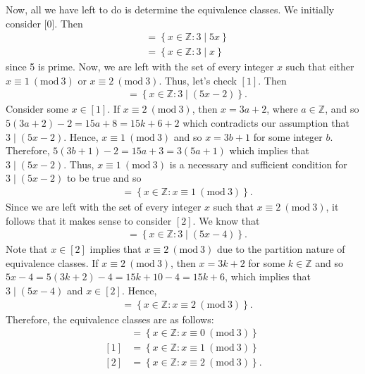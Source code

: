 \documentclass[12pt]{article}
\newcommand{\Z}{\mathbb{Z}}
\newcommand{\Mod}[1]{\ (\mathrm{mod}\ #1)}
\newenvironment{problem}[2][Problem]{\begin{trivlist} \item[\hskip \labelsep {\bfseries #1}\hskip \labelsep {\bfseries #2.}]}{\end{trivlist}}
\newenvironment{solution}[2][Solution]{\begin{trivlist} \item[\hskip \labelsep {\bfseries #1}\hskip \labelsep {\bfseries #2.}]}{\end{trivlist}}
\begin{document}
\begin{problem}{49}
\begin{solution}{49}
    Now, all we have left to do is determine the equivalence classes. We initially consider [0]. Then
    \begin{align*}
      [0] &= \left\{ x\in \Z:3\mid 5x \right\}\\
      &= \left\{ x\in \Z: 3\mid x \right\}
    \end{align*}
    since 5 is prime. Now, we are left with the set of every integer $x$ such that either $x \equiv 1 \Mod 3$ or $x \equiv 2 \Mod 3$. Thus, let's check $[1]$. Then
    \begin{align*}
      [1] &= \left\{x\in \Z:3\mid(5x-2)\right\}.
    \end{align*}
    Consider some $x\in [1]$. If $x \equiv 2\Mod 3$, then $x=3a+2$, where $a\in\Z$, and so $5(3a+2)-2=15a+8=15k+6+2$ which contradicts our assumption that $3\mid(5x-2)$. Hence, $x \equiv 1\Mod 3$ and so $x=3b+1$ for some integer $b$. Therefore, $5(3b+1)-2=15a+3 = 3(5a+1)$ which implies that $3\mid (5x-2)$. Thus, $x\equiv 1\Mod 3$ is a necessary and sufficient condition for $3\mid(5x-2)$ to be true and so
     \begin{align*}
      [1] &= \left\{x\in \Z:x\equiv 1\Mod 3\right\}.
    \end{align*}
    Since we are left with the set of every integer $x$ such that $x\equiv 2\Mod 3$, it follows that it makes sense to consider $[2]$. We know that
    \begin{align*}
      [2] &= \left\{ x\in \Z:3\mid(5x-4) \right\}.
    \end{align*}
    Note that $x\in [2]$ implies that $x\equiv 2\Mod 3$ due to the partition nature of equivalence classes. If $x\equiv 2\Mod 3$, then $x=3k+2$ for some $k\in\Z$ and so $5x-4 = 5(3k+2)-4= 15k+10-4= 15k+6$, which implies that $3\mid (5x-4)$ and $x\in [2]$. Hence, 
    \begin{align*}
      [2] &= \left\{ x\in \Z:x\equiv 2 \Mod3 \right\}.
    \end{align*}
    Therefore, the equivalence classes are as follows:
    \begin{align*}
      [0] &= \left\{ x\in \Z:x\equiv 0\Mod 3 \right\}\\
      [1] &= \left\{x\in \Z:x\equiv 1\Mod 3\right\}\\
      [2] &= \left\{ x\in \Z:x\equiv 2 \Mod3 \right\}.
    \end{align*}
  \end{solution}
\end{problem}
\end{document}
